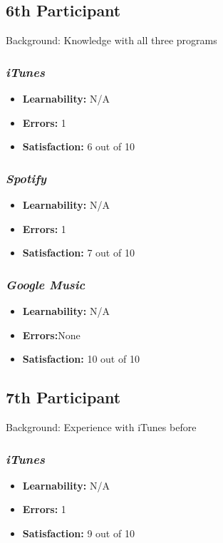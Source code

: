\documentclass{article}
\begin{document}
\begin{multicols}{2}
\subsection{6th Participant}
Background: Knowledge with all three programs

\subsubsection{\it iTunes}
\begin{itemize}
	\item {\bf Learnability:} N/A
	\item {\bf Errors:} 1
	\item {\bf Satisfaction:} 6 out of 10 
\end{itemize}

\subsubsection{\it Spotify}
\begin{itemize}
	\item {\bf Learnability:} N/A
	\item {\bf Errors:} 1
	\item {\bf Satisfaction:} 7 out of 10 
\end{itemize}

\subsubsection{\it Google Music}
\begin{itemize}
\item {\bf Learnability:} N/A
	\item {\bf Errors:}None
	\item {\bf Satisfaction:} 10 out of 10 
\end{itemize}  
\subsection{7th Participant}
Background: Experience with iTunes before

\subsubsection{\it iTunes}
\begin{itemize}
	\item {\bf Learnability:} N/A
	\item {\bf Errors:} 1
	\item {\bf Satisfaction:} 9 out of 10 
\end{itemize}


\end{multicols}
\end{document}
